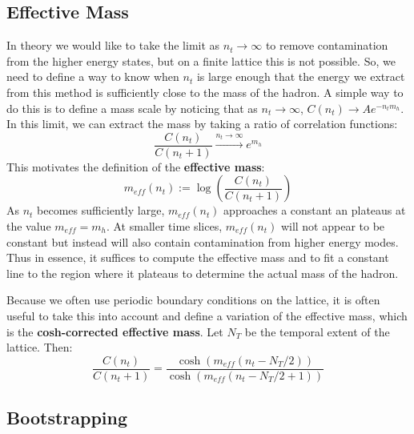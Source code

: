 \documentclass[11pt, oneside]{article}   	%
\theoremstyle{definition}
\begin{document}
\subsection{Effective Mass}

In theory we would like to take the limit as $n_t\rightarrow\infty$ to remove contamination from the higher energy 
states, but on a finite lattice this is not possible. So, we need to define a way to know when $n_t$ is large enough 
that the energy we extract from this method is sufficiently close to the mass of the hadron. A simple way to do this 
is to define a mass scale by noticing that as $n_t\rightarrow\infty$, $C(n_t)\rightarrow Ae^{-n_t m_h}$. 
In this limit, we can extract the mass by taking a ratio of correlation functions:
\begin{equation}
	\frac{C(n_t)}{C(n_t + 1)}\xrightarrow{n_t\rightarrow\infty} e^{m_h}
\end{equation}
This motivates the definition of the \textbf{effective mass}:
\begin{equation}
	m_{eff}(n_t) := \log\left(\frac{C(n_t)}{C(n_t + 1)}\right)
\end{equation}
As $n_t$ becomes sufficiently large, $m_{eff}(n_t)$ approaches a constant an plateaus at the value $m_{eff} = m_h$. 
At smaller time slices, $m_{eff}(n_t)$ will not appear to be constant but instead will also contain contamination from 
higher energy modes. Thus in essence, it suffices to compute the effective mass and to fit a constant line to the 
region where it plateaus to determine the actual mass of the hadron. 

Because we often use periodic boundary conditions on the lattice, it is often useful to take this into account and 
define a variation of the effective mass, which is the \textbf{cosh-corrected effective mass}. Let $N_T$ be the temporal 
extent of the lattice. Then:
\begin{equation}
	\frac{C(n_t)}{C(n_t + 1)} = \frac{\cosh(m_{eff}(n_t - N_T / 2))}{\cosh(m_{eff}(n_t - N_T / 2+ 1))}
\end{equation}

\subsection{Bootstrapping}
\end{document}
